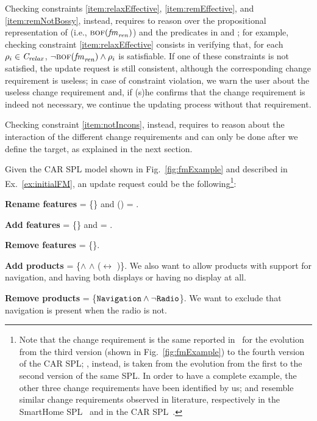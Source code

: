 \begin{tikzborder}{\cite{Gargantini16:validation}}
\begin{tikzborder}{\cite{gargantini_combinatorial_2017}}
\begin{tikzborder}{\cite{gargantini_combinatorial_2017}}
\begin{tikzborder}{\cite{garn2019}}
\begin{tikzborder}{\cite{arcaini2019achieving}}
	Checking constraints \ref{item:relaxEffective}, \ref{item:remEffective}, and \ref{item:remNotBossy}, instead, requires to reason over the propositional representation of \fmrenamed (i.e., $\textsc{bof}(\mathit{fm}_{\mathit{ren}})$) and the predicates in \CFrelax and \CFrem; for example, checking constraint \ref{item:relaxEffective} consists in verifying that, for each $\rho_i \in \mathit{C_{relax}}$, $\neg \textsc{bof}(\mathit{fm}_{\mathit{ren}}) \wedge \rho_i$ is satisfiable. If one of these constraints is not satisfied, the update request is still consistent, although the corresponding change requirement is useless; in case of constraint violation, we warn the user about the useless change requirement and, if (s)he confirms that the change requirement is indeed not necessary, we continue the updating process without that requirement.
	
	Checking constraint \ref{item:notIncons}, instead, requires to reason about the interaction of the different change requirements and can only be done after we define the target, as explained in the next section.
	
	\begin{exmp}\label{ex:updReq}
		Given the CAR SPL model shown in Fig.~\ref{fig:fmExample} and described in Ex.~\ref{ex:initialFM}, an update request could be the following\footnote{Note that the change requirement \Fadd is the same reported in~\cite{Pleuss2012} for the evolution from the third version (shown in Fig.~\ref{fig:fmExample}) to the fourth version of the CAR SPL; \CFrem, instead, is taken from the evolution from the first to the second version of the same SPL. In order to have a complete example, the other three change requirements have been identified by us; \Ftbr and \Frem resemble similar change requirements observed in literature, respectively in the SmartHome SPL~\cite{smartHomePaper} and in the CAR SPL~\cite{Pleuss2012}.}:
		\begin{compactitem}
			\item \textbf{Rename features} \Ftbr = \{\MonochromeRadioDisplay{}\} and \rename(\MonochromeRadioDisplay) = \RadioDisplay.
			\item \textbf{Add features} \Fadd = \{\DVDEntertainment{}\} and \parent{\DVDEntertainment} = \MultimediaDevices.
			\item \textbf{Remove features} \Frem = \{\OtherFeatures{}\}.
			\item \textbf{Add products} \CFrelax = \{\MultimediaDevices $\wedge$ \Navigation $\wedge$ (\MonochromeNavigationDisplay $\leftrightarrow$ \ColorNavigationDisplay{})\}. We also want to allow products with support for navigation, and having both displays or having no display at all. 
			\item \textbf{Remove products} \CFrem = \{${\tt Nav\-i\-ga\-tion} \wedge \neg {\tt Radio}$\}. We want to exclude that navigation is present when the radio is not.
		\end{compactitem}
	\end{exmp}
	\be
	

\end{tikzborder}
\end{tikzborder}
\end{tikzborder}
\end{tikzborder}
\end{tikzborder}
